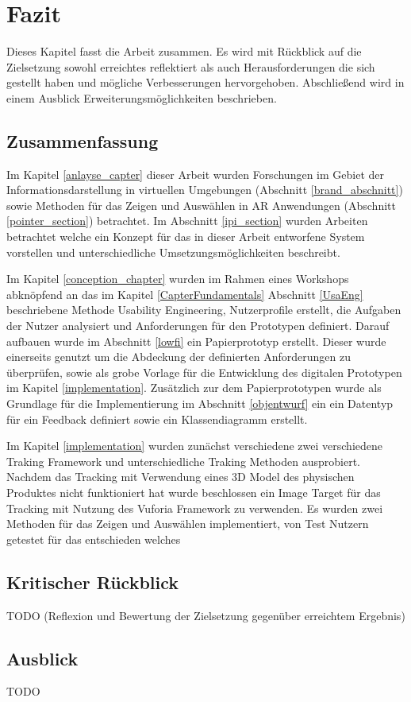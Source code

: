 \chapter{Fazit}

Dieses Kapitel fasst die Arbeit zusammen. Es wird mit Rückblick auf die Zielsetzung sowohl erreichtes reflektiert als auch Herausforderungen die sich gestellt haben und mögliche Verbesserungen hervorgehoben. 
Abschließend wird in einem Ausblick Erweiterungsmöglichkeiten beschrieben. 

\section{Zusammenfassung}

Im Kapitel \ref{anlayse_capter} dieser Arbeit wurden Forschungen im Gebiet der Informationsdarstellung in virtuellen Umgebungen (Abschnitt \ref{brand_abschnitt}) sowie Methoden für das 
Zeigen und Auswählen in AR Anwendungen (Abschnitt \ref{pointer_section}) betrachtet. Im Abschnitt \ref{ipi_section} wurden Arbeiten betrachtet welche ein Konzept für das in dieser Arbeit entworfene System vorstellen
und unterschiedliche Umsetzungsmöglichkeiten beschreibt. 

Im Kapitel \ref{conception_chapter} wurden im Rahmen eines Workshops abknöpfend an das im Kapitel \ref{CapterFundamentals} Abschnitt \ref{UsaEng} beschriebene Methode Usability Engineering, Nutzerprofile erstellt, die Aufgaben 
der Nutzer analysiert und Anforderungen für den Prototypen definiert. Darauf aufbauen wurde im Abschnitt \ref{lowfi} ein Papierprototyp erstellt. Dieser wurde einerseits genutzt um die Abdeckung der definierten Anforderungen 
zu überprüfen, sowie als grobe Vorlage für die Entwicklung des digitalen Prototypen im Kapitel \ref{implementation}. Zusätzlich zur dem Papierprototypen wurde als Grundlage für die Implementierung im Abschnitt \ref{objentwurf} ein 
ein Datentyp für ein Feedback definiert sowie ein Klassendiagramm erstellt. 

Im Kapitel \ref{implementation} wurden zunächst verschiedene zwei verschiedene Traking Framework und unterschiedliche Traking Methoden ausprobiert. 
Nachdem das Tracking mit Verwendung eines 3D Model des physischen Produktes nicht funktioniert hat wurde beschlossen ein Image Target für das Tracking mit Nutzung
des Vuforia Framework zu verwenden. 
Es wurden zwei Methoden für das Zeigen und Auswählen implementiert, von Test Nutzern getestet für das entschieden welches 




\section{Kritischer Rückblick}
TODO (Reflexion und Bewertung der Zielsetzung gegenüber erreichtem Ergebnis)

\section{Ausblick}
TODO